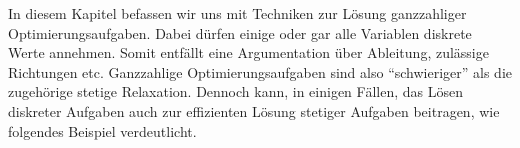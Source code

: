 In diesem Kapitel befassen wir uns mit Techniken zur Lösung ganzzahliger Optimierungsaufgaben. Dabei dürfen einige oder gar alle Variablen diskrete Werte annehmen.
Somit entfällt eine Argumentation über Ableitung, zulässige Richtungen etc. Ganzzahlige Optimierungsaufgaben sind also \enquote{schwieriger} als die zugehörige stetige Relaxation. Dennoch kann, in einigen Fällen, das Lösen diskreter Aufgaben auch zur effizienten Lösung stetiger Aufgaben beitragen, wie folgendes Beispiel verdeutlicht.